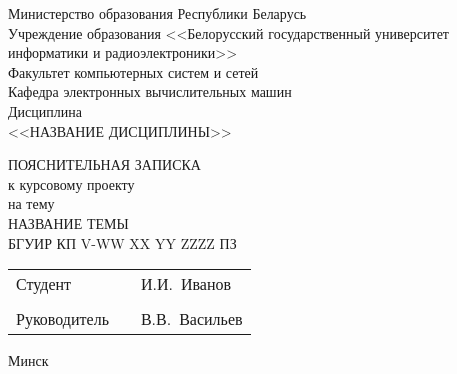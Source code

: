 \thispagestyle{empty}

{\centering
    Министерство образования Республики Беларусь\\[1em]
    Учреждение образования <<Белорусский государственный университет информатики и радиоэлектроники>>\\[2em]

    Факультет компьютерных систем и сетей\\[1em]
    Кафедра электронных вычислительных машин\\[1em]
    Дисциплина\\
    <<НАЗВАНИЕ ДИСЦИПЛИНЫ>>

    \vfill
    
    ПОЯСНИТЕЛЬНАЯ ЗАПИСКА\\
    к курсовому проекту\\
    на тему\\[1em]
    \MakeUppercase{НАЗВАНИЕ ТЕМЫ}\\[1em]
    БГУИР КП V-WW XX YY ZZZZ ПЗ\\

    \vfill
    
    \begin{flushleft}
    \begin{tabular}{@{}p{}p{}p{}}
        Студент                         &&   И.И.~Иванов      \\
                                        &&                    \\
        Руководитель                    &&   В.В.~Васильев    \\
    \end{tabular}
    \end{flushleft}
    
    \vfill
    \normalsize Минск \the\year \\
}

\newpage
